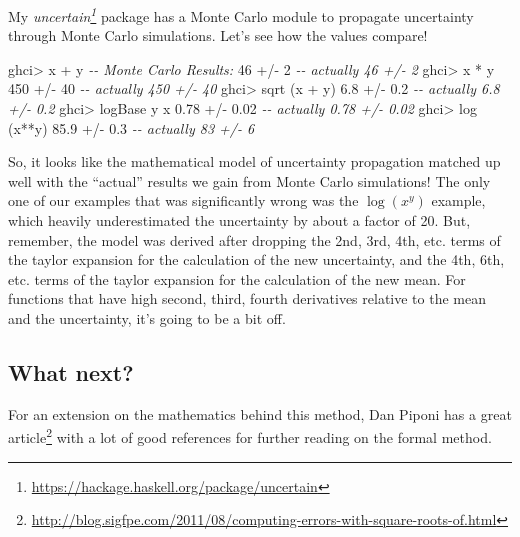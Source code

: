 \documentclass[]{article}
\newenvironment{Shaded}{}{}
\newcommand{\CommentTok}[1]{\textcolor[rgb]{0.38,0.63,0.69}{\textit{#1}}}
\newcommand{\DecValTok}[1]{\textcolor[rgb]{0.25,0.63,0.44}{#1}}
\newcommand{\FloatTok}[1]{\textcolor[rgb]{0.25,0.63,0.44}{#1}}
\newcommand{\FunctionTok}[1]{\textcolor[rgb]{0.02,0.16,0.49}{#1}}
\newcommand{\NormalTok}[1]{#1}
\newcommand{\OperatorTok}[1]{\textcolor[rgb]{0.40,0.40,0.40}{#1}}
\renewcommand{\href}[2]{#2\footnote{\url{#1}}}
\begin{document}
My \emph{\href{https://hackage.haskell.org/package/uncertain}{uncertain}}
package has a Monte Carlo module to propagate uncertainty through Monte Carlo
simulations. Let's see how the values compare!

\begin{Shaded}
\begin{Highlighting}[]
\NormalTok{ghci}\OperatorTok{>}\NormalTok{ x }\OperatorTok{+}\NormalTok{ y         }\CommentTok{{-}{-} Monte Carlo Results:}
\DecValTok{46} \OperatorTok{+/{-}} \DecValTok{2}            \CommentTok{{-}{-} actually 46 +/{-} 2}
\NormalTok{ghci}\OperatorTok{>}\NormalTok{ x }\OperatorTok{*}\NormalTok{ y}
\DecValTok{450} \OperatorTok{+/{-}} \DecValTok{40}          \CommentTok{{-}{-} actually 450 +/{-} 40}
\NormalTok{ghci}\OperatorTok{>} \FunctionTok{sqrt}\NormalTok{ (x }\OperatorTok{+}\NormalTok{ y)}
\FloatTok{6.8} \OperatorTok{+/{-}} \FloatTok{0.2}         \CommentTok{{-}{-} actually 6.8 +/{-} 0.2}
\NormalTok{ghci}\OperatorTok{>} \FunctionTok{logBase}\NormalTok{ y x}
\FloatTok{0.78} \OperatorTok{+/{-}} \FloatTok{0.02}       \CommentTok{{-}{-} actually 0.78 +/{-} 0.02}
\NormalTok{ghci}\OperatorTok{>} \FunctionTok{log}\NormalTok{ (x}\OperatorTok{**}\NormalTok{y)}
\FloatTok{85.9} \OperatorTok{+/{-}} \FloatTok{0.3}        \CommentTok{{-}{-} actually 83 +/{-} 6}
\end{Highlighting}
\end{Shaded}

So, it looks like the mathematical model of uncertainty propagation matched up
well with the ``actual'' results we gain from Monte Carlo simulations! The only
one of our examples that was significantly wrong was the
\(\operatorname{log}(x^y)\) example, which heavily underestimated the
uncertainty by about a factor of 20. But, remember, the model was derived after
dropping the 2nd, 3rd, 4th, etc. terms of the taylor expansion for the
calculation of the new uncertainty, and the 4th, 6th, etc. terms of the taylor
expansion for the calculation of the new mean. For functions that have high
second, third, fourth derivatives relative to the mean and the uncertainty, it's
going to be a bit off.

\hypertarget{what-next}{%
\subsection{What next?}\label{what-next}}

For an extension on the mathematics behind this method, Dan Piponi has a
\href{http://blog.sigfpe.com/2011/08/computing-errors-with-square-roots-of.html}{great
article} with a lot of good references for further reading on the formal method.
\end{document}
